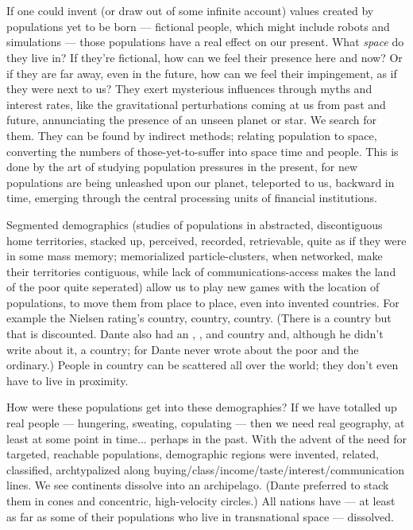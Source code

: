 \chapter{}

If one could invent (or draw out of some infinite account) values created by populations yet to be born --- fictional people, which might include robots and simulations --- those populations have a real effect on our present. What \emph{space} do they live in? If they're fictional, how can we feel their presence here and now? Or if they are far away, even in the future, how can we feel their impingement, as if they were next to us? They exert mysterious influences through myths and interest rates, like the gravitational perturbations coming at us from past and future, annunciating the presence of an unseen planet or star. We search for them. They can be found by indirect methods; relating population to space, converting the numbers of those-yet-to-suffer into space time and people. This is done by the art of studying population pressures in the present, for new populations are being unleashed upon our planet, teleported to us, backward in time, emerging through the central processing units of financial institutions.

Segmented demographics (studies of populations in abstracted, discontiguous home territories, stacked up, perceived, recorded, retrievable, quite as if they were in some mass memory; memorialized particle-clusters, when networked, make their territories contiguous, while lack of communications-access makes the land of the poor quite seperated) allow us to play new games with the location of populations, to move them from place to place, even into invented countries. For example the Nielsen rating's \cA country, \cB country, \cC country. (There is a \cD country but that is discounted. Dante also had an \cA, \cB, and \cC country and, although he didn't write about it, a \cD country; for Dante never wrote about the poor and the ordinary.) People in \cA country can be scattered all over the world; they don't even have to live in proximity.

How were these populations get into these demographies? If we have totalled up real people --- hungering, sweating, copulating --- then we need real geography, at least at some point in time... perhaps in the past. With the advent of the need for targeted, reachable populations, demographic regions were invented, related, classified, archtypalized along buying\slash class\slash income\slash taste\slash interest\slash communication lines. We see continents dissolve into an archipelago. (Dante preferred to stack them in cones and concentric, high-velocity circles.) All nations have --- at least as far as some of their populations who live in transnational space --- dissolved.

